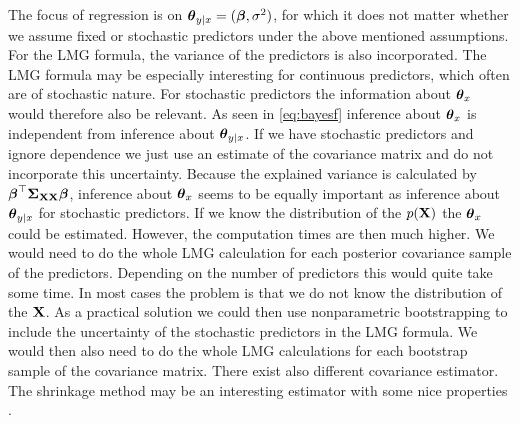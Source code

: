\documentclass[11pt,a4paper,twoside]{book}
\begin{document}
  The focus of regression is on ${\boldsymbol{\theta}}{}_{y \mid x} = ({\boldsymbol{\beta}}, \sigma^2)$, for which it does not matter whether we assume fixed or stochastic predictors under the above mentioned assumptions. For the LMG formula, the variance of the predictors is also incorporated. The LMG formula may be especially interesting for continuous predictors, which often are of stochastic nature. For stochastic predictors the information about ${\boldsymbol{\theta}}{}_{x}$ would therefore also be relevant.  As seen in \eqref{eq:bayesf} inference about ${\boldsymbol{\theta}}{}_{x}$  is independent from inference about ${\boldsymbol{\theta}}{}_{y \mid x}$. If we have stochastic predictors and ignore dependence we just use an estimate of the covariance matrix and do not incorporate this uncertainty.  Because the explained variance is calculated by ${\boldsymbol{\beta}}^\top {\boldsymbol{\Sigma}}{}_{{\mathbf{X}} {\mathbf{X}}}  {\boldsymbol{\beta}}$, inference about  ${\boldsymbol{\theta}}{}_{x}$  seems to be equally important as inference about ${\boldsymbol{\theta}}{}_{y \mid x}$ for stochastic predictors. If we know the distribution of the $p({\mathbf{X}})$ the ${\boldsymbol{\theta}}{}_{x}$ could be estimated. However, the computation times are then much higher. We would need to do the whole LMG calculation for each posterior covariance sample of the predictors. Depending on the number of predictors this would quite take some time.  In most cases the problem is that we do not know the distribution of the ${\mathbf{X}}$. As a practical solution we could then use nonparametric bootstrapping to include the uncertainty of the stochastic predictors in the LMG formula. We would then also need to do the whole LMG calculations for each bootstrap sample of the covariance matrix. There exist also different covariance estimator. The shrinkage method may be an interesting estimator with some nice properties \citep{Schafer2005}. 
  
  
  
 

 

\end{document}
